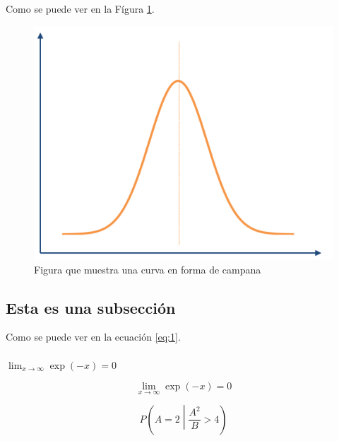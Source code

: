 \documentclass[a4paper,12pt, spanish, twocolumn]{article}
\begin{document}
		Como se puede ver en la Fígura \ref{fig:bellcurve}.
		\begin{figure}[ht]
		    \centering %
		    \includegraphics[scale=0.3]{BellCurve.png}
		    \caption{Figura que muestra una curva en forma de campana}
    		\label{fig:bellcurve} %
		\end{figure}

		\subsection{Esta es una subsección}
			\blindtext[5]
			Como se puede ver en la ecuación \ref{eq:1}.
			\\\\
			\noindent
			$ \lim_{x \to \infty} \exp(-x) = 0 $
			
			\begin{equation} \label{eq:1}
			\lim_{x \to \infty} \exp(-x) = 0
			\end{equation}
			
			\begin{equation} \label{eq:2}
			P\left(A=2\middle|\frac{A^2}{B}>4\right)
			\end{equation}
\end{document}
